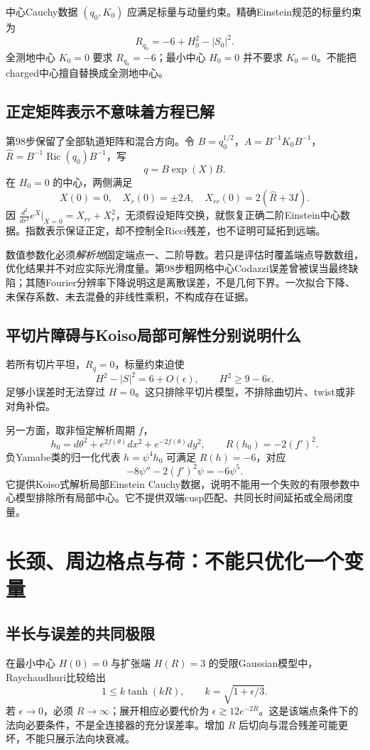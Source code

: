 \documentclass[UTF8,a4paper,11pt,fontset=fandol]{ctexart}
\numberwithin{equation}{section}
\theoremstyle{definition}
\newcommand{\Ric}{\operatorname{Ric}}
\begin{document}
中心Cauchy数据 $(q_0,K_0)$ 应满足标量与动量约束。精确Einstein规范的标量约束为
\[
R_{q_0}=-6+H_0^2-|S_0|^2.
\]
全测地中心 $K_0=0$ 要求 $R_{q_0}=-6$；最小中心 $H_0=0$ 并不要求 $K_0=0$。不能把charged中心擅自替换成全测地中心。

\subsection{正定矩阵表示不意味着方程已解}
第98步保留了全部轨道矩阵和混合方向。令 $B=q_0^{1/2}$，$A=B^{-1}K_0B^{-1}$，$\widehat R=B^{-1}\Ric(q_0)B^{-1}$，写
\[
q=B\exp(X)B.
\]
在 $H_0=0$ 的中心，两侧满足
\[
X(0)=0,\quad X_r(0)=\pm2A,\quad X_{rr}(0)=2(\widehat R+3I).
\]
因 $\frac{d^2}{dr^2}e^X|_{X=0}=X_{rr}+X_r^2$，无须假设矩阵交换，就恢复正确二阶Einstein中心数据。指数表示保证正定，却不控制全Ricci残差，也不证明可延拓到远端。

数值参数化必须\emph{解析地}固定端点一、二阶导数。若只是评估时覆盖端点导数数组，优化结果并不对应实际光滑度量。第98步粗网格中心Codazzi误差曾被误当最终缺陷；其随Fourier分辨率下降说明这是离散误差，不是几何下界。一次拟合下降、未保存系数、未去混叠的非线性乘积，不构成存在证据。

\subsection{平切片障碍与Koiso局部可解性分别说明什么}
若所有切片平坦，$R_q=0$，标量约束迫使
\[
H^2-|S|^2=6+O(\epsilon),\qquad
H^2\ge9-6\epsilon.
\]
足够小误差时无法穿过 $H=0$。这只排除平切片模型，不排除曲切片、twist或非对角补偿。

另一方面，取非恒定解析周期 $f$，
\[
h_0=d\theta^2+e^{2f(\theta)}dx^2+e^{-2f(\theta)}dy^2,
\qquad R(h_0)=-2(f')^2.
\]
负Yamabe类的归一化代表 $h=\psi^4h_0$ 可满足 $R(h)=-6$，对应
\[
-8\psi''-2(f')^2\psi=-6\psi^5.
\]
它提供Koiso式解析局部Einstein Cauchy数据，说明不能用一个失败的有限参数中心模型排除所有局部中心。它不提供双端cusp匹配、共同长时间延拓或全局闭度量。

\section{长颈、周边格点与荷：不能只优化一个变量}
\subsection{半长与误差的共同极限}
在最小中心 $H(0)=0$ 与扩张端 $H(R)=3$ 的受限Gaussian模型中，Raychaudhuri比较给出
\[
1\le k\tanh(kR),\qquad k=\sqrt{1+\epsilon/3}.
\]
若 $\epsilon\to0$，必须 $R\to\infty$；展开相应必要代价为 $\epsilon\gtrsim12e^{-2R}$。这是该端点条件下的法向必要条件，不是全连接器的充分误差率。增加 $R$ 后切向与混合残差可能更坏，不能只展示法向块衰减。
\end{document}
